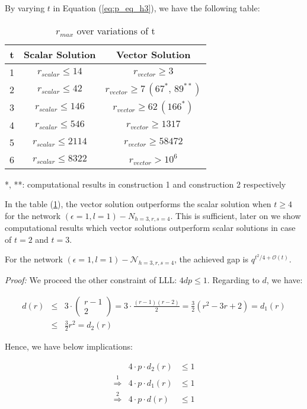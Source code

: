 By varying $t$ in Equation (\ref{eq:p_eq_h3}), we have the following
table:

\begin{table}[H]
\caption{$r_{max}$ over variations of t\label{tab:rmax_over_t}}

\begin{tabular}{|c|c|c|}
\hline 
t & Scalar Solution & Vector Solution\tabularnewline
\hline 
\hline 
1 & $r_{scalar}\leq14$ & $r_{vector}\geq3$\tabularnewline
\hline 
2 & $r_{scalar}\leq42$ & $r_{vector}\geq7\,\left(67^{*},\,89^{**}\right)$\tabularnewline
\hline 
3 & $r_{scalar}\leq146$ & $r_{vector}\geq62\,\left(166^{*}\right)$ \tabularnewline
\hline 
4 & $r_{scalar}\leq546$ & $r_{vector}\geq1317$\tabularnewline
\hline 
5 & $r_{scalar}\leq2114$ & $r_{vector}\geq58472$\tabularnewline
\hline 
6 & $r_{scalar}\leq8322$ & $r_{vector}>10^{6}$\tabularnewline
\hline 
\end{tabular}

{*}, {*}{*}: computational results in construction 1 and construction
2 respectively
\end{table}

In the table (\ref{tab:rmax_over_t}), the vector solution outperforms
the scalar solution when $t\geq4$ for the network $\left(\epsilon=1,l=1\right)-\ensuremath{N}_{h=3,r,s=4}$.
This is sufficient, later on we show computational results which vector
solutions outperform scalar solutions in case of $t=2$ and $t=3$.
\begin{conjecture}
For the network $\left(\epsilon=1,l=1\right)-\mathcal{N}_{h=3,r,s=4}$,
the achieved gap is $q^{t^{2}/4+\mathcal{O}(t)}$.
\end{conjecture}
\textit{Proof:} We proceed the other constraint of LLL: $4dp\leq1$.
Regarding to $d$, we have:

\begin{eqnarray*}
d(r) & \leq & 3\cdot\left(\begin{array}{c}
r-1\\
2
\end{array}\right)=3\cdot\frac{\left(r-1\right)\left(r-2\right)}{2}=\frac{3}{2}\left(r^{2}-3r+2\right)=d_{1}(r)\\
 & \leq & \frac{3}{2}r^{2}=d_{2}(r)
\end{eqnarray*}

Hence, we have below implications:

\begin{eqnarray*}
 & 4\cdot p\cdot d_{2}(r) & \leq1\\
\overset{1}{\Rightarrow} & 4\cdot p\cdot d_{1}(r) & \leq1\\
\overset{2}{\Rightarrow} & 4\cdot p\cdot d(r) & \leq1
\end{eqnarray*}

